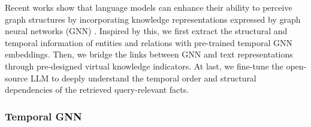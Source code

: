 \documentclass[11pt]{article}
\begin{document}
Recent works show that language models can enhance their ability to perceive graph structures by incorporating knowledge representations expressed by graph neural networks (GNN) \cite{GREASELM}.
Inspired by this, we first extract the structural and temporal information of entities and relations with pre-trained temporal GNN embeddings.
Then, we bridge the links between GNN and text representations through pre-designed virtual knowledge indicators.
At last, we fine-tune the open-source LLM to deeply understand the temporal order and structural dependencies of the retrieved query-relevant facts.


\subsubsection{Temporal GNN}
\end{document}
